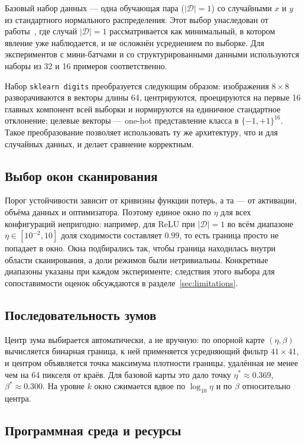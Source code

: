 Базовый набор данных --- одна обучающая пара ($|\mathcal{D}|=1$) со случайными
$x$ и $y$ из стандартного нормального распределения. Этот выбор унаследован от
работы~\cite{sohl2024}, где случай $|\mathcal{D}|=1$ рассматривается как
минимальный, в котором явление уже наблюдается, и не осложнён усреднением по
выборке. Для экспериментов с мини-батчами и со структурированными данными
используются наборы из 32 и 16 примеров соответственно.

Набор \texttt{sklearn digits} преобразуется следующим образом: изображения
$8\times8$ разворачиваются в векторы длины 64, центрируются, проецируются на
первые 16 главных компонент всей выборки и нормируются на единичное
стандартное отклонение; целевые векторы --- one-hot представление класса в
$\{-1,+1\}^{16}$. Такое преобразование позволяет использовать ту же
архитектуру, что и для случайных данных, и делает сравнение корректным.

\subsection{Выбор окон сканирования}

Порог устойчивости зависит от кривизны функции потерь, а та --- от активации,
объёма данных и оптимизатора. Поэтому единое окно по $\eta$ для всех
конфигураций непригодно: например, для ReLU при $|\mathcal{D}|=1$ во всём
диапазоне $\eta\in[10^{-2},10]$ доля сходимости составляет $0.99$, то есть
граница просто не попадает в окно. Окна подбирались так, чтобы граница
находилась внутри области сканирования, а доли режимов были нетривиальны.
Конкретные диапазоны указаны при каждом эксперименте; следствия этого выбора
для сопоставимости оценок обсуждаются в разделе~\ref{sec:limitations}.

\subsection{Последовательность зумов}

Центр зума выбирается автоматически, а не вручную: по опорной карте
$(\eta,\beta)$ вычисляется бинарная граница, к ней применяется усредняющий
фильтр $41\times41$, и центром объявляется точка максимума плотности границы,
удалённая не менее чем на 64 пикселя от краёв. Для базовой карты это дало
точку $\eta^\ast \approx 0.369$, $\beta^\ast \approx 0.300$. На уровне $k$
окно сжимается вдвое по $\log_{10}\eta$ и по $\beta$ относительно центра.

\subsection{Программная среда и ресурсы}

